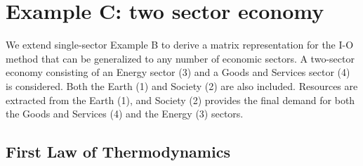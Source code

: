 %
%
%
\chapter{Example C: two sector economy}
\label{chap:two_sector} %





We extend single-sector Example B to derive a matrix representation for the I-O method that can be generalized to any number of economic sectors. A two-sector economy consisting of an Energy sector (3) and a Goods and Services sector (4) is considered. Both the Earth (1) and Society (2) are also included. Resources are extracted from the Earth (1), and Society (2) provides the final demand for both the Goods and Services (4) and the Energy (3) sectors.

\section{First Law of Thermodynamics}

